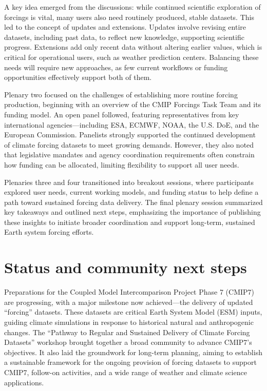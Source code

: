 \documentclass{ametsocV6.1}
\begin{document}
A key idea emerged from the discussions: while continued scientific exploration of forcings is vital, many users also need routinely produced, stable datasets. This led to the concept of updates and extensions. Updates involve revising entire datasets, including past data, to reflect new knowledge, supporting scientific progress. Extensions add only recent data without altering earlier values, which is critical for operational users, such as weather prediction centers. Balancing these needs will require new approaches, as few current workflows or funding opportunities effectively support both of them.

Plenary two focused on the challenges of establishing more routine forcing production, beginning with an overview of the CMIP Forcings Task Team and its funding model. An open panel followed, featuring representatives from key international agencies—including ESA, ECMWF, NOAA, the U.S. DoE, and the European Commission. Panelists strongly supported the continued development of climate forcing datasets to meet growing demands. However, they also noted that legislative mandates and agency coordination requirements often constrain how funding can be allocated, limiting flexibility to support all user needs.

Plenaries three and four transitioned into breakout sessions, where participants explored user needs, current working models, and funding status to help define a path toward sustained forcing data delivery. The final plenary session summarized key takeaways and outlined next steps, emphasizing the importance of publishing these insights to initiate broader coordination and support long-term, sustained Earth system forcing efforts.

\section*{Status and community next steps}
Preparations for the Coupled Model Intercomparison Project Phase 7 (CMIP7) are progressing, with a major milestone now achieved—the delivery of updated ``forcing'' datasets. These datasets are critical Earth System Model (ESM) inputs, guiding climate simulations in response to historical natural and anthropogenic changes. The ``Pathway to Regular and Sustained Delivery of Climate Forcing Datasets'' workshop brought together a broad community to advance CMIP7’s objectives. It also laid the groundwork for long-term planning, aiming to establish a sustainable framework for the ongoing provision of forcing datasets to support CMIP7, follow-on activities, and a wide range of weather and climate science applications.
\end{document}
